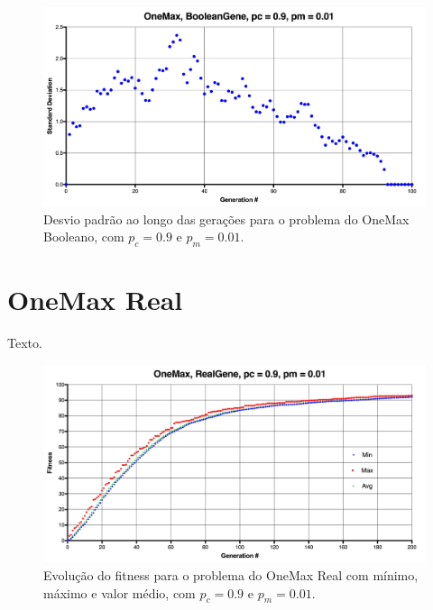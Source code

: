 \begin{figure}[ht!]
    \centering \includegraphics[width=1.0\textwidth]{onemax_boolean_std.jpg}
    \caption{Desvio padrão ao longo das gerações para o problema do OneMax Booleano, com $p_c=0.9$ e $p_m=0.01$.}
    \label{fig:onemax_boolean}
\end{figure}

\section{OneMax Real}

Texto.

\begin{figure}[ht!]
    \centering \includegraphics[width=1.0\textwidth]{onemax_real.jpg}
    \caption{Evolução do fitness para o problema do OneMax Real com mínimo, máximo e valor médio, com $p_c=0.9$ e $p_m=0.01$.}
    \label{fig:onemax_boolean}
\end{figure}

